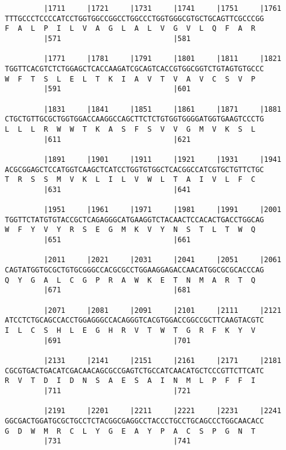 \documentclass{article}
\begin{document}
\begin{Verbatim}
         |1711     |1721     |1731     |1741     |1751     |1761
TTTGCCCTCCCCATCCTGGTGGCCGGCCTGGCCCTGGTGGGCGTGCTGCAGTTCGCCCGG
F  A  L  P  I  L  V  A  G  L  A  L  V  G  V  L  Q  F  A  R  
         |571                          |581                 
  
         |1771     |1781     |1791     |1801     |1811     |1821
TGGTTCACGTCTCTGGAGCTCACCAAGATCGCAGTCACCGTGGCGGTCTGTAGTGTGCCC
W  F  T  S  L  E  L  T  K  I  A  V  T  V  A  V  C  S  V  P  
         |591                          |601                 
  
         |1831     |1841     |1851     |1861     |1871     |1881
CTGCTGTTGCGCTGGTGGACCAAGGCCAGCTTCTCTGTGGTGGGGATGGTGAAGTCCCTG
L  L  L  R  W  W  T  K  A  S  F  S  V  V  G  M  V  K  S  L  
         |611                          |621                 
  
         |1891     |1901     |1911     |1921     |1931     |1941
ACGCGGAGCTCCATGGTCAAGCTCATCCTGGTGTGGCTCACGGCCATCGTGCTGTTCTGC
T  R  S  S  M  V  K  L  I  L  V  W  L  T  A  I  V  L  F  C  
         |631                          |641                 
  
         |1951     |1961     |1971     |1981     |1991     |2001
TGGTTCTATGTGTACCGCTCAGAGGGCATGAAGGTCTACAACTCCACACTGACCTGGCAG
W  F  Y  V  Y  R  S  E  G  M  K  V  Y  N  S  T  L  T  W  Q  
         |651                          |661                 
  
         |2011     |2021     |2031     |2041     |2051     |2061
CAGTATGGTGCGCTGTGCGGGCCACGCGCCTGGAAGGAGACCAACATGGCGCGCACCCAG
Q  Y  G  A  L  C  G  P  R  A  W  K  E  T  N  M  A  R  T  Q  
         |671                          |681                 
  
         |2071     |2081     |2091     |2101     |2111     |2121
ATCCTCTGCAGCCACCTGGAGGGCCACAGGGTCACGTGGACCGGCCGCTTCAAGTACGTC
I  L  C  S  H  L  E  G  H  R  V  T  W  T  G  R  F  K  Y  V  
         |691                          |701                 
  
         |2131     |2141     |2151     |2161     |2171     |2181
CGCGTGACTGACATCGACAACAGCGCCGAGTCTGCCATCAACATGCTCCCGTTCTTCATC
R  V  T  D  I  D  N  S  A  E  S  A  I  N  M  L  P  F  F  I  
         |711                          |721                 
  
         |2191     |2201     |2211     |2221     |2231     |2241
GGCGACTGGATGCGCTGCCTCTACGGCGAGGCCTACCCTGCCTGCAGCCCTGGCAACACC
G  D  W  M  R  C  L  Y  G  E  A  Y  P  A  C  S  P  G  N  T  
         |731                          |741                 
  

\end{Verbatim}
\end{document}
